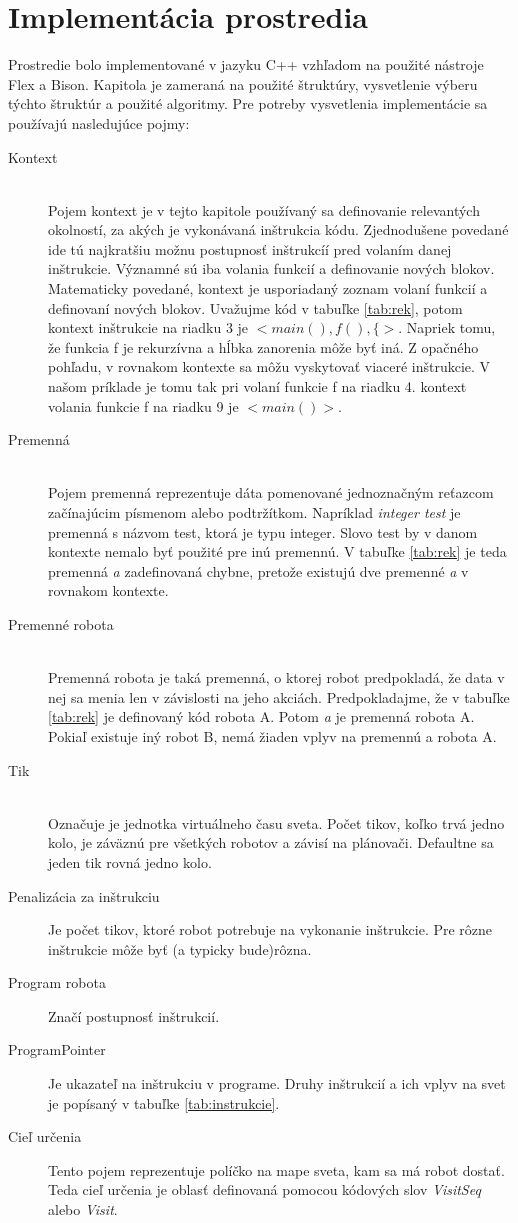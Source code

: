 \chapter{Implementácia prostredia}
Prostredie bolo implementované v jazyku C++ vzhľadom na použité nástroje Flex a Bison. Kapitola je zameraná na použité štruktúry, vysvetlenie výberu týchto štruktúr a použité algoritmy. Pre potreby vysvetlenia implementácie sa používajú nasledujúce pojmy:
\begin{description}
\item[Kontext]\hfill \\
	Pojem kontext je v tejto kapitole používaný sa definovanie relevantých okolností, za akých je vykonávaná inštrukcia kódu. Zjednodušene povedané ide tú najkratšiu možnu postupnosť inštrukcíí pred volaním danej inštrukcie. Významné sú iba volania funkcií a definovanie nových blokov. Matematicky povedané, kontext je usporiadaný zoznam volaní funkcií a definovaní nových blokov. Uvažujme kód v tabuľke \ref{tab:rek}, potom kontext inštrukcie na riadku 3 je $<main(),f(),\{>$. Napriek tomu, že funkcia f je rekurzívna a hĺbka zanorenia môže byť iná. Z opačného pohľadu, v rovnakom kontexte sa môžu vyskytovať viaceré inštrukcie. V našom príklade je tomu tak pri volaní funkcie f na riadku 4. kontext volania  funkcie f na riadku 9 je $<main()>$.
\item[Premenná] \hfill \\
	Pojem premenná reprezentuje dáta pomenované jednoznačným reťazcom začínajúcim písmenom alebo podtržítkom. Napríklad \emph{integer test} je premenná s názvom test, ktorá je typu integer. Slovo test by v danom kontexte nemalo byť použité pre inú premennú. V tabuľke \ref{tab:rek} je teda premenná \emph{a} zadefinovaná chybne, pretože existujú dve premenné \emph{a} v rovnakom kontexte.
\item[Premenné robota]\hfill \\
Premenná robota je taká premenná, o ktorej robot predpokladá, že data v nej sa menia len v závislosti na jeho akciách. Predpokladajme, že v tabuľke \ref{tab:rek} je definovaný kód robota A. Potom \emph{a} je premenná robota A. Pokiaľ existuje iný robot B, nemá žiaden vplyv na premennú a robota A.
\item [Tik] \hfill \\
	Označuje je jednotka virtuálneho času sveta. Počet tikov, koľko trvá jedno kolo, je záväznú pre všetkých robotov a závisí na plánovači. Defaultne sa jeden tik rovná jedno kolo.
\item[Penalizácia za inštrukciu]
	Je počet tikov, ktoré robot potrebuje na vykonanie inštrukcie. Pre rôzne inštrukcie môže byť (a typicky bude)rôzna.
\item [Program robota]
	Značí postupnosť inštrukcií.
\item [ProgramPointer]
 	Je ukazateľ na inštrukciu v programe. Druhy inštrukcií a ich vplyv na svet je popísaný v tabuľke \ref{tab:instrukcie}.
\item[Cieľ určenia]
	Tento pojem reprezentuje políčko na mape sveta, kam sa má robot dostať. Teda cieľ určenia je oblasť definovaná pomocou kódových slov \emph{VisitSeq} alebo \emph{Visit}.
\end{description}

